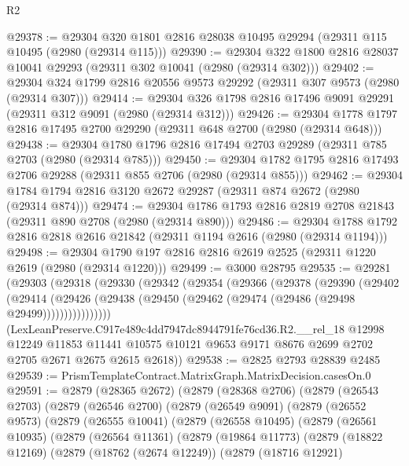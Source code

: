 \begin{lexlean}{R2}
\begin{coremodule}
@29378 := @29304 @320 @1801 @2816 @28038 @10495 @29294 (@29311 @115 @10495 (@2980 (@29314 @115)))
@29390 := @29304 @322 @1800 @2816 @28037 @10041 @29293 (@29311 @302 @10041 (@2980 (@29314 @302)))
@29402 := @29304 @324 @1799 @2816 @20556 @9573 @29292 (@29311 @307 @9573 (@2980 (@29314 @307)))
@29414 := @29304 @326 @1798 @2816 @17496 @9091 @29291 (@29311 @312 @9091 (@2980 (@29314 @312)))
@29426 := @29304 @1778 @1797 @2816 @17495 @2700 @29290 (@29311 @648 @2700 (@2980 (@29314 @648)))
@29438 := @29304 @1780 @1796 @2816 @17494 @2703 @29289 (@29311 @785 @2703 (@2980 (@29314 @785)))
@29450 := @29304 @1782 @1795 @2816 @17493 @2706 @29288 (@29311 @855 @2706 (@2980 (@29314 @855)))
@29462 := @29304 @1784 @1794 @2816 @3120 @2672 @29287 (@29311 @874 @2672 (@2980 (@29314 @874)))
@29474 := @29304 @1786 @1793 @2816 @2819 @2708 @21843 (@29311 @890 @2708 (@2980 (@29314 @890)))
@29486 := @29304 @1788 @1792 @2816 @2818 @2616 @21842 (@29311 @1194 @2616 (@2980 (@29314 @1194)))
@29498 := @29304 @1790 @197 @2816 @2816 @2619 @2525 (@29311 @1220 @2619 (@2980 (@29314 @1220)))
@29499 := @3000 @28795
@29535 := @29281
    (@29303
      (@29318
        (@29330
          (@29342
            (@29354
              (@29366
                (@29378
                  (@29390
                    (@29402
                      (@29414
                        (@29426
                          (@29438 (@29450 (@29462 (@29474 (@29486 (@29498 @29499))))))))))))))))
      (LexLeanPreserve.C917e489c4dd7947dc8944791fe76cd36.R2.__rel_18
        @12998
        @12249
        @11853
        @11441
        @10575
        @10121
        @9653
        @9171
        @8676
        @2699
        @2702
        @2705
        @2671
        @2675
        @2615
        @2618))
@29538 := @2825 @2793 @28839 @2485
@29539 := PrismTemplateContract.MatrixGraph.MatrixDecision.casesOn.{0}
@29591 := @2879
    (@28365 @2672)
    (@2879
      (@28368 @2706)
      (@2879
        (@26543 @2703)
        (@2879
          (@26546 @2700)
          (@2879
            (@26549 @9091)
            (@2879
              (@26552 @9573)
              (@2879
                (@26555 @10041)
                (@2879
                  (@26558 @10495)
                  (@2879
                    (@26561 @10935)
                    (@2879
                      (@26564 @11361)
                      (@2879
                        (@19864 @11773)
                        (@2879
                          (@18822 @12169)
                          (@2879
                            (@18762 (@2674 @12249))
                            (@2879
                              (@18716 @12921)

\end{coremodule}
\end{lexlean}
